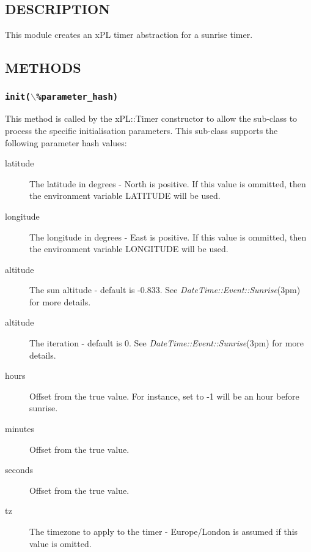 \subsection*{DESCRIPTION\label{xPL::Timer::sunrise_DESCRIPTION}}


This module creates an xPL timer abstraction for a sunrise timer.

\subsection*{METHODS\label{xPL::Timer::sunrise_METHODS}}
\subsubsection*{\texttt{init($\backslash$\%parameter\_hash)}\label{xPL::Timer::sunrise_init_backslash_parameter_hash_}}


This method is called by the xPL::Timer constructor to allow the
sub-class to process the specific initialisation parameters.  This
sub-class supports the following parameter hash values:

\begin{description}

\item[{latitude}] \mbox{}

The latitude in degrees - North is positive.  If this value is
ommitted, then the environment variable LATITUDE will be used.


\item[{longitude}] \mbox{}

The longitude in degrees - East is positive.  If this value is
ommitted, then the environment variable LONGITUDE will be used.


\item[{altitude}] \mbox{}

The sun altitude - default is -0.833.  See \emph{DateTime::Event::Sunrise}(3pm)
for more details.


\item[{altitude}] \mbox{}

The iteration - default is 0.  See \emph{DateTime::Event::Sunrise}(3pm)
for more details.


\item[{hours}] \mbox{}

Offset from the true value.  For instance, set to -1 will be an hour
before sunrise.


\item[{minutes}] \mbox{}

Offset from the true value.


\item[{seconds}] \mbox{}

Offset from the true value.


\item[{tz}] \mbox{}

The timezone to apply to the timer - Europe/London is assumed if this
value is omitted.

\end{description}
